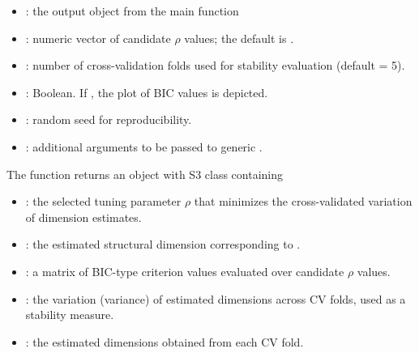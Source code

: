 \begin{itemize}
\item {}: the output object from the main function  
\item {}: numeric vector of candidate $\rho$ values; the default is .
\item {}: number of cross-validation folds used for stability evaluation (default = 5).
\item {}: Boolean. If , the plot of BIC values is depicted.  
\item {}: random seed for reproducibility.
\item \code{$\cdots$}: additional arguments to be passed to generic .
\end{itemize}

The function  returns an object with S3 class  containing
\begin{itemize}
	\item {}: the selected tuning parameter $\rho$ that minimizes the cross-validated variation of dimension estimates.
	\item {}: the estimated structural dimension corresponding to .
	\item {}: a matrix of BIC-type criterion values evaluated over candidate $\rho$ values.
	\item {}: the variation (variance) of estimated dimensions across CV folds, used as a stability measure.
	\item {}: the estimated dimensions obtained from each CV fold.
\end{itemize}

